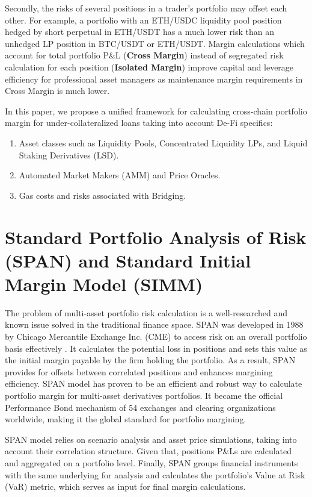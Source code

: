 \documentclass[conference]{IEEEtran}
\begin{document}
Secondly, the risks of several positions in a trader's portfolio may offset each other. For example, a portfolio with an ETH/USDC liquidity pool position hedged by short perpetual in ETH/USDT has a much lower risk than an unhedged LP position in BTC/USDT or ETH/USDT. Margin calculations which account for total portfolio P\&L (\textbf {Cross Margin}) instead of segregated risk calculation for each position (\textbf {Isolated Margin}) improve capital and leverage efficiency for professional asset managers as maintenance margin requirements in Cross Margin is much lower. 

In this paper, we propose a unified framework for calculating cross-chain portfolio margin for under-collateralized loans taking into account De-Fi specifics:
  
  \begin{enumerate}
  \item Asset classes such as Liquidity Pools, Concentrated Liquidity LPs, and Liquid Staking Derivatives (LSD).
  \item Automated Market Makers (AMM) and Price Oracles.
  \item Gas costs and risks associated with Bridging.
  \end{enumerate}

 	


\section{Standard Portfolio Analysis of Risk (SPAN) and Standard Initial Margin Model (SIMM)}

The problem of multi-asset portfolio risk calculation is a well-researched and known issue solved in the traditional finance space. SPAN was developed in 1988 by Chicago Mercantile Exchange Inc. (CME) to access risk on an overall portfolio basis effectively \cite{cme-span}. It calculates the potential loss in positions and sets this value as the initial margin payable by the firm holding the portfolio. As a result, SPAN provides for offsets between correlated positions and enhances margining efficiency. SPAN model has proven to be an efficient and robust way to calculate portfolio margin for multi-asset derivatives portfolios. It became the official Performance Bond mechanism of 54 exchanges and clearing organizations worldwide, making it the global standard for portfolio margining. 

SPAN model relies on scenario analysis and asset price simulations, taking into account their correlation structure. Given that, positions P\&Ls are calculated and aggregated on a portfolio level. Finally, SPAN groups financial instruments with the same underlying for analysis and calculates the portfolio's Value at Risk (VaR) metric, which serves as input for final margin calculations. 
\end{document}
